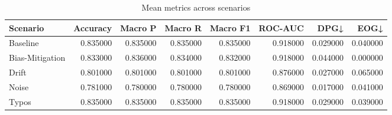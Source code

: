 \begin{table}
\caption{Mean metrics across scenarios}
\label{tab:peerj_metrics}
\begin{tabular}{lrrrrrrr}
\toprule
Scenario & Accuracy & Macro P & Macro R & Macro F1 & ROC-AUC & DPG↓ & EOG↓ \\
\midrule
Baseline & 0.835000 & 0.835000 & 0.835000 & 0.835000 & 0.918000 & 0.029000 & 0.040000 \\
Bias-Mitigation & 0.833000 & 0.836000 & 0.834000 & 0.832000 & 0.918000 & 0.044000 & 0.000000 \\
Drift & 0.801000 & 0.801000 & 0.801000 & 0.801000 & 0.876000 & 0.027000 & 0.065000 \\
Noise & 0.781000 & 0.780000 & 0.780000 & 0.780000 & 0.869000 & 0.017000 & 0.041000 \\
Typos & 0.835000 & 0.835000 & 0.835000 & 0.835000 & 0.918000 & 0.029000 & 0.039000 \\
\bottomrule
\end{tabular}
\end{table}
